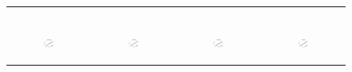 \begin{figure}[ht]
\begin{tabular}{cccc}
\begin{subfigure}[b]{0.22\textwidth}
			\caption{}
			\label{appfig:runtime_zigzag_setcover}
	  \end{subfigure} \\
	  \begin{subfigure}[b]{0.22\textwidth}
	  	\includegraphics[width=110pt]{images/speedup_bigsynthetic_maxgraphcut.eps}
			\caption{}
			\label{appfig:speedup_bigsynthetic_maxgraphcut}
	  \end{subfigure} &
	  \begin{subfigure}[b]{0.22\textwidth}
	  	\includegraphics[width=110pt]{images/speedup_bigsynthetic_setcover.eps}
			\caption{}
			\label{appfig:speedup_bigsynthetic_setcover}
	  \end{subfigure} &
	  \begin{subfigure}[b]{0.22\textwidth}
	  	\includegraphics[width=110pt]{images/speedup_zigzag_maxgraphcut.eps}
			\caption{}
			\label{appfig:speedup_zigzag_maxgraphcut}
	  \end{subfigure} &
	  \begin{subfigure}[b]{0.22\textwidth}
	  	\includegraphics[width=110pt]{images/speedup_zigzag_setcover.eps}
			\caption{}

\end{subfigure}
\end{tabular}
\end{figure}
